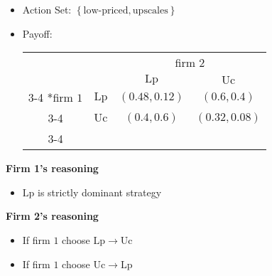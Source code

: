\begin{eg}
\begin{enumerate}
\begin{itemize}
			      \item Action Set: \(\left\{\text{low-priced}, \text{upscales}\right\}\)
			      \item Payoff:
			            \begin{table}[H]
				            \centering
				            \setlength{\extrarowheight}{2pt}
				            \begin{tabular}{cc|c|c|}
					                                    & \multicolumn{1}{c}{} & \multicolumn{2}{c}{firm $2$}                                          \\
					                                    & \multicolumn{1}{c}{} & \multicolumn{1}{c}{$\mathrm{Lp}$} & \multicolumn{1}{c}{$\mathrm{Uc}$} \\\cline{3-4}
					            \multirow{2}*{firm $1$} & $\mathrm{Lp}$        & $(0.48, 0.12)$                    & $(0.6, 0.4)$                      \\\cline{3-4}
					                                    & $\mathrm{Uc}$        & $(0.4, 0.6)$                      & $(0.32, 0.08)$                    \\\cline{3-4}
				            \end{tabular}
			            \end{table}
		      \end{itemize}
		      \textbf{Firm 1's reasoning}
		      \begin{itemize}
			      \item \(\mathrm{Lp}\) is strictly dominant strategy
		      \end{itemize}

		      \textbf{Firm 2's reasoning}
		      \begin{itemize}
			      \item If firm \(1\) choose \(\mathrm{Lp} \to \mathrm{Uc}\)
			      \item If firm \(1\) choose \(\mathrm{Uc} \to \mathrm{Lp}\)
		      \end{itemize}


\end{enumerate}
\end{eg}
